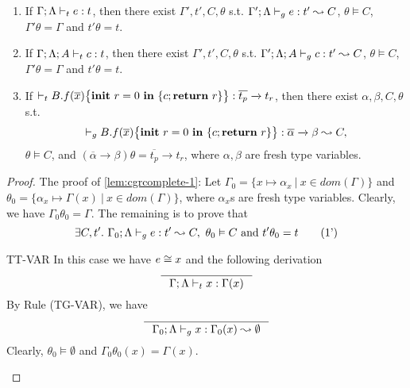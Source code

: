 {{{\begin{lemma}
\begin{enumerate}[label={(\alph*)}]
\item\label{lem:cgrcomplete-1} If $\Gamma;\Lambda \vdash_{t} e : t$, then there exist $\Gamma',t',C,\theta$ s.t. $\Gamma';\Lambda \vdash_{g} e : t' \leadsto C$,  $\theta \vDash C$, $\Gamma'\theta =\Gamma$ and $t'\theta = t$.

\item\label{lem:cgrcomplete-2} If $\Gamma;\Lambda; A \vdash_{t} c : t$, then there exist $\Gamma',t',C,\theta$ s.t. $\Gamma';\Lambda; A \vdash_{g} c : t' \leadsto C$,  $\theta \vDash C$, $\Gamma'\theta =\Gamma$ and $t'\theta = t$.

\item\label{lem:cgrcomplete-3} If $\vdash_{t} {B.f}(\overline{x})\big\{{{\textbf{init}~ {r}=0 ~\textbf{in}~\{{c};\textbf{return}~{r}\}}}\big\} : \overline{t_p}\xrightarrow{} t_r$, then there exist $\alpha,\beta,C,\theta$ s.t.
$$
\vdash_{g} {B.f}(\overline{x})\big\{{{\textbf{init}~ {r}=0 ~\textbf{in}~\{{c};\textbf{return}~{r}\}}}\big\}: \overline{\alpha}\xrightarrow{} \beta \leadsto C,
$$
$\theta \vDash C$, and $(\overline{\alpha}\xrightarrow{} \beta)\theta = \overline{t_p}\xrightarrow{} t_r$, where $\alpha,\beta$ are fresh type variables.
\end{enumerate}
\end{lemma}
\begin{proof}
The proof of \ref{lem:cgrcomplete-1}:
Let $\Gamma_{0} = \{x \mapsto \alpha_{x} ~|~ x \in dom(\Gamma) \} $
and $\theta_{0} = \{\alpha_{x}\mapsto \Gamma(x)~|~x\in dom(\Gamma)\} $, where $\alpha_x$s are fresh type variables.
Clearly,  we have $\Gamma_{0}\theta_{0} = \Gamma$.
The remaining is to prove that
\begin{equation*}
\exists C, t'.~\Gamma_{0};\Lambda \vdash_{g} e : t' \leadsto C,~ \theta_{0}\vDash C  \textrm{ and } t'\theta_{0} = t \tag{1'}
\end{equation*}
\begin{ProofEnumDesc}
\item[TT-VAR] In this case we have $e\cong x$ and the following derivation
\begin{equation*}
\inference{}
{\Gamma;\trace \vdash_{t} \leVAR{x} : \Gamma(x)}
\end{equation*}
By Rule {(TG-VAR)}, we have
\begin{equation*}
\inference{}
{\Gamma_{0};\trace \vdash_{g} \leVAR{x} : \Gamma_{0}(x)\leadsto \emptyset}
\end{equation*}
Clearly, $\theta_{0} \vDash \emptyset$ and $\Gamma_{0}\theta_{0}(x) = \Gamma(x)$.


\end{ProofEnumDesc}
\end{proof}}}}
